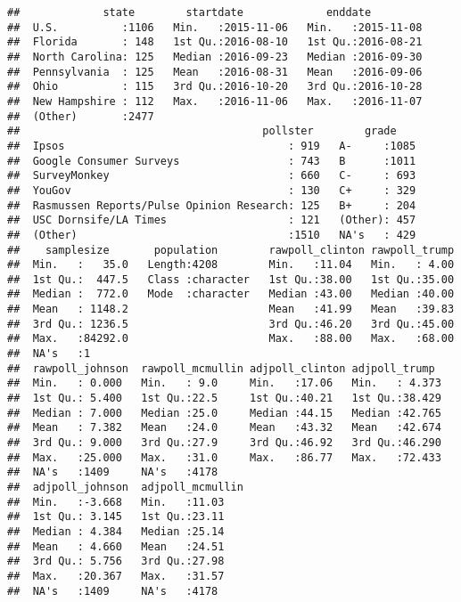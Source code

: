 \documentclass[
]{article}
\begin{document}
\begin{verbatim}
##             state        startdate             enddate          
##  U.S.          :1106   Min.   :2015-11-06   Min.   :2015-11-08  
##  Florida       : 148   1st Qu.:2016-08-10   1st Qu.:2016-08-21  
##  North Carolina: 125   Median :2016-09-23   Median :2016-09-30  
##  Pennsylvania  : 125   Mean   :2016-08-31   Mean   :2016-09-06  
##  Ohio          : 115   3rd Qu.:2016-10-20   3rd Qu.:2016-10-28  
##  New Hampshire : 112   Max.   :2016-11-06   Max.   :2016-11-07  
##  (Other)       :2477                                            
##                                      pollster        grade     
##  Ipsos                                   : 919   A-     :1085  
##  Google Consumer Surveys                 : 743   B      :1011  
##  SurveyMonkey                            : 660   C-     : 693  
##  YouGov                                  : 130   C+     : 329  
##  Rasmussen Reports/Pulse Opinion Research: 125   B+     : 204  
##  USC Dornsife/LA Times                   : 121   (Other): 457  
##  (Other)                                 :1510   NA's   : 429  
##    samplesize       population        rawpoll_clinton rawpoll_trump  
##  Min.   :   35.0   Length:4208        Min.   :11.04   Min.   : 4.00  
##  1st Qu.:  447.5   Class :character   1st Qu.:38.00   1st Qu.:35.00  
##  Median :  772.0   Mode  :character   Median :43.00   Median :40.00  
##  Mean   : 1148.2                      Mean   :41.99   Mean   :39.83  
##  3rd Qu.: 1236.5                      3rd Qu.:46.20   3rd Qu.:45.00  
##  Max.   :84292.0                      Max.   :88.00   Max.   :68.00  
##  NA's   :1                                                           
##  rawpoll_johnson  rawpoll_mcmullin adjpoll_clinton adjpoll_trump   
##  Min.   : 0.000   Min.   : 9.0     Min.   :17.06   Min.   : 4.373  
##  1st Qu.: 5.400   1st Qu.:22.5     1st Qu.:40.21   1st Qu.:38.429  
##  Median : 7.000   Median :25.0     Median :44.15   Median :42.765  
##  Mean   : 7.382   Mean   :24.0     Mean   :43.32   Mean   :42.674  
##  3rd Qu.: 9.000   3rd Qu.:27.9     3rd Qu.:46.92   3rd Qu.:46.290  
##  Max.   :25.000   Max.   :31.0     Max.   :86.77   Max.   :72.433  
##  NA's   :1409     NA's   :4178                                     
##  adjpoll_johnson  adjpoll_mcmullin
##  Min.   :-3.668   Min.   :11.03   
##  1st Qu.: 3.145   1st Qu.:23.11   
##  Median : 4.384   Median :25.14   
##  Mean   : 4.660   Mean   :24.51   
##  3rd Qu.: 5.756   3rd Qu.:27.98   
##  Max.   :20.367   Max.   :31.57   
##  NA's   :1409     NA's   :4178
\end{verbatim}
\end{document}

